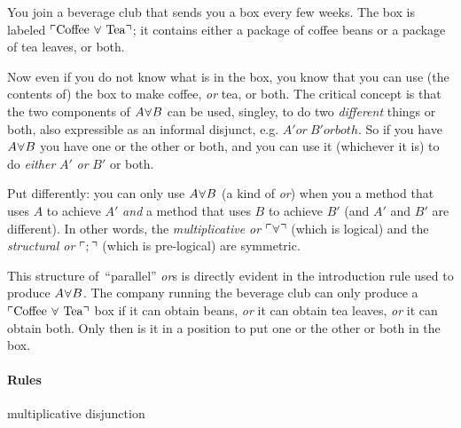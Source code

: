 \documentclass{article}
\begin{document}
You join a beverage club that sends you a box every few weeks. The
box is labeled
\(\ulcorner\text{Coffee}\ \fission\ \text{Tea}\urcorner\); it contains
either a package of coffee beans or a package of tea leaves, or both.

Now even if you do not know what is in the box, you know that you can
use (the contents of) the box to make coffee, \textit{or} tea, or
both. The critical concept is that the two components of \(A\fission
B\) can be used, singley, to do two \textit{different} things or both,
also expressible as an informal disjunct, e.g. \(A' \textit{or}\ B'
\textit{or} both\). So if you have \(A\fission B\) you have one or the
other or both, and you can use it (whichever it is) to do \textit{either}
\(A'\) \textit{or} \(B'\) or both.

Put differently: you can only use \(A\fission B\) (a kind of
\textit{or}) when you a method that uses \(A\) to achieve \(A'\)
\textit{and} a method that uses \(B\) to achieve \(B'\) (and \(A'\)
and \(B'\) are different). In other words, the \textit{multiplicative
  or} \(\ulcorner\fission\urcorner\) (which is logical) and the
\textit{structural or} \(\ulcorner\structor\urcorner\) (which is
pre-logical) are symmetric.

This structure of\ \enquote{parallel} \textit{or}s is directly evident in the
introduction rule used to produce \(A\fission B\). The company running
the beverage club can only produce a
\(\ulcorner\text{Coffee}\ \fission\ \text{Tea}\urcorner\) box if it can
obtain beans, \textit{or} it can obtain tea leaves, \textit{or} it can
obtain both. Only then is it in a position to put one or the other
or both in the box.

\paragraph{Rules} multiplicative disjunction

\end{document}

